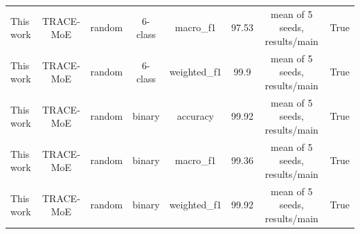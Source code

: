 \begin{table}[htbp]
\begin{tabular}{lccccccc}
This work & TRACE-MoE & random & 6-class & macro\_f1 & 97.53 & mean of 5 seeds, results/main & True \\
This work & TRACE-MoE & random & 6-class & weighted\_f1 & 99.9 & mean of 5 seeds, results/main & True \\
This work & TRACE-MoE & random & binary & accuracy & 99.92 & mean of 5 seeds, results/main & True \\
This work & TRACE-MoE & random & binary & macro\_f1 & 99.36 & mean of 5 seeds, results/main & True \\
This work & TRACE-MoE & random & binary & weighted\_f1 & 99.92 & mean of 5 seeds, results/main & True \\
\bottomrule
\end{tabular}
\end{table}